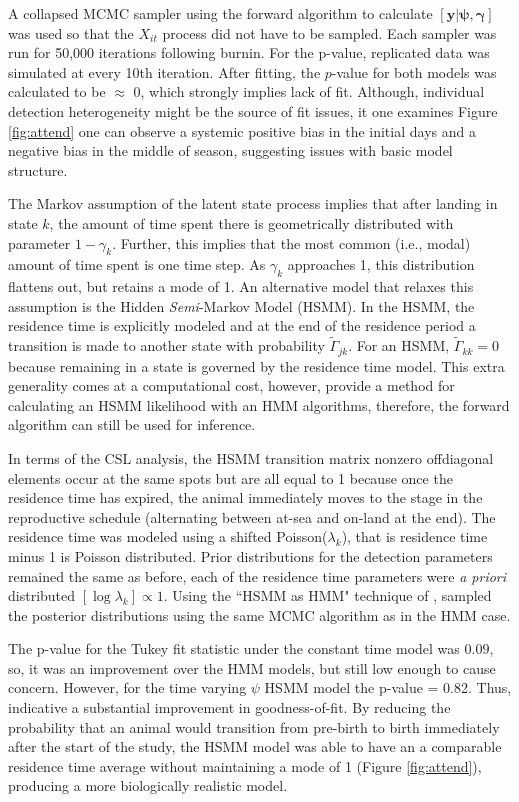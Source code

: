 \documentclass[12pt,english]{article}
\begin{document}
\begin{spacing}{1.9}
 A collapsed MCMC sampler using the forward algorithm to calculate $[\mathbf{y}|\boldsymbol{\psi},\boldsymbol{\gamma}]$ was used so that the $X_{it}$ process did not have to be sampled. Each sampler was run for 50,000 iterations following burnin. For the p-value, replicated data was simulated at every 10th iteration. After fitting, the $p$-value for both models was calculated to be $\approx$ 0, which strongly implies lack of fit.  Although, individual detection heterogeneity might be the source of fit issues, it one examines Figure \ref{fig:attend} one can observe a systemic positive bias in the initial days and a negative bias in the middle of season, suggesting issues with basic model structure.     
 
 The Markov assumption of the latent state process implies that after landing in state $k$, the amount of time spent there is geometrically distributed with parameter $1-\gamma_k$. Further, this implies that the most common (i.e., modal) amount of time spent is one time step. As $\gamma_k$ approaches 1, this distribution flattens out, but retains a mode of 1. An alternative model that relaxes this assumption is the Hidden {\it Semi}-Markov Model (HSMM). In the HSMM, the residence time is explicitly modeled and at the end of the residence period a transition is made to another state with probability $\tilde\Gamma_{jk}$. For an HSMM, $\tilde\Gamma_{kk} = 0$ because remaining in a state is governed by the residence time model. This extra generality comes at a computational cost, however, \citet{langrock2011hidden} provide a method for calculating an HSMM likelihood with an HMM algorithms, therefore, the forward algorithm can still be used for inference. 
 
    In terms of the CSL analysis, the HSMM transition matrix nonzero offdiagonal elements occur at the same spots but are all equal to 1 because once the residence time has expired, the animal immediately moves to the stage in the reproductive schedule (alternating between at-sea and on-land at the end). The residence time was modeled using a shifted Poisson($\lambda_k$), that is residence time minus 1 is Poisson distributed. Prior distributions for the detection parameters remained the same as before, each of the residence time parameters were {\it a priori} distributed $[\log \lambda_k] \propto 1$. Using the ``HSMM as HMM" technique of \citet{langrock2011hidden}, sampled the posterior distributions using the same MCMC algorithm as in the HMM case. 
    
    The p-value for the Tukey fit statistic under the constant time model was $0.09$, so, it was an improvement over the HMM models, but still low enough to cause concern. However, for the time varying $\psi$ HSMM model the p-value = 0.82. Thus, indicative a substantial improvement in goodness-of-fit. By reducing the probability that an animal would transition from pre-birth to birth immediately after the start of the study, the HSMM model was able to have an a comparable residence time average without maintaining a mode of 1 (Figure \ref{fig:attend}), producing a more biologically realistic model.    
     

\end{spacing}
\end{document}
